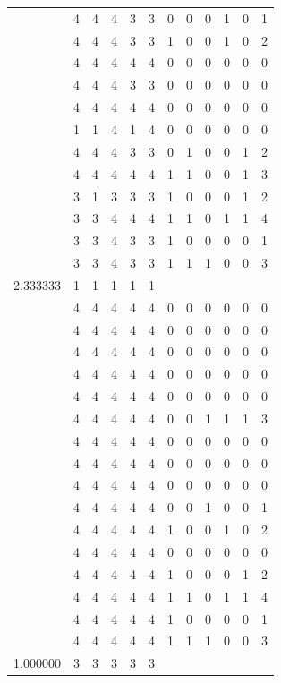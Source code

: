 \documentclass[]{book}
\theoremstyle{definition}
\theoremstyle{definition}
\theoremstyle{definition}
\theoremstyle{remark}
\begin{document}
\begin{table}
{\begin{tabular}[t]{rrrrrrrrrrrr}
 & 4 & 4 & 4 & 3 & 3 & 0 & 0 & 0 & 1 & 0 & 1\\
 & 4 & 4 & 4 & 3 & 3 & 1 & 0 & 0 & 1 & 0 & 2\\
 & 4 & 4 & 4 & 4 & 4 & 0 & 0 & 0 & 0 & 0 & 0\\
 & 4 & 4 & 4 & 3 & 3 & 0 & 0 & 0 & 0 & 0 & 0\\
 & 4 & 4 & 4 & 4 & 4 & 0 & 0 & 0 & 0 & 0 & 0\\
 & 1 & 1 & 4 & 1 & 4 & 0 & 0 & 0 & 0 & 0 & 0\\
 & 4 & 4 & 4 & 3 & 3 & 0 & 1 & 0 & 0 & 1 & 2\\
 & 4 & 4 & 4 & 4 & 4 & 1 & 1 & 0 & 0 & 1 & 3\\
 & 3 & 1 & 3 & 3 & 3 & 1 & 0 & 0 & 0 & 1 & 2\\
 & 3 & 3 & 4 & 4 & 4 & 1 & 1 & 0 & 1 & 1 & 4\\
 & 3 & 3 & 4 & 3 & 3 & 1 & 0 & 0 & 0 & 0 & 1\\
 & 3 & 3 & 4 & 3 & 3 & 1 & 1 & 1 & 0 & 0 & 3\\
2.333333 & 1 & 1 & 1 & 1 & 1 &  &  &  &  &  & \\
 & 4 & 4 & 4 & 4 & 4 & 0 & 0 & 0 & 0 & 0 & 0\\
 & 4 & 4 & 4 & 4 & 4 & 0 & 0 & 0 & 0 & 0 & 0\\
 & 4 & 4 & 4 & 4 & 4 & 0 & 0 & 0 & 0 & 0 & 0\\
 & 4 & 4 & 4 & 4 & 4 & 0 & 0 & 0 & 0 & 0 & 0\\
 & 4 & 4 & 4 & 4 & 4 & 0 & 0 & 0 & 0 & 0 & 0\\
 & 4 & 4 & 4 & 4 & 4 & 0 & 0 & 1 & 1 & 1 & 3\\
 & 4 & 4 & 4 & 4 & 4 & 0 & 0 & 0 & 0 & 0 & 0\\
 & 4 & 4 & 4 & 4 & 4 & 0 & 0 & 0 & 0 & 0 & 0\\
 & 4 & 4 & 4 & 4 & 4 & 0 & 0 & 0 & 0 & 0 & 0\\
 & 4 & 4 & 4 & 4 & 4 & 0 & 0 & 1 & 0 & 0 & 1\\
 & 4 & 4 & 4 & 4 & 4 & 1 & 0 & 0 & 1 & 0 & 2\\
 & 4 & 4 & 4 & 4 & 4 & 0 & 0 & 0 & 0 & 0 & 0\\
 & 4 & 4 & 4 & 4 & 4 & 1 & 0 & 0 & 0 & 1 & 2\\
 & 4 & 4 & 4 & 4 & 4 & 1 & 1 & 0 & 1 & 1 & 4\\
 & 4 & 4 & 4 & 4 & 4 & 1 & 0 & 0 & 0 & 0 & 1\\
 & 4 & 4 & 4 & 4 & 4 & 1 & 1 & 1 & 0 & 0 & 3\\
1.000000 & 3 & 3 & 3 & 3 & 3 &  &  &  &  &  & \\

\end{tabular}}
\end{table}
\end{document}
